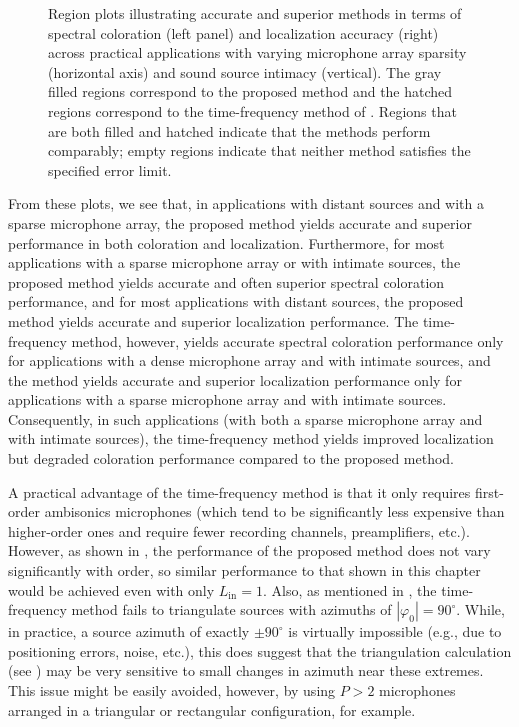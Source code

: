 \begin{figure}[t]
	\caption[Region plots of practical applicability of each interpolation method.]{
	Region plots illustrating accurate and superior methods in terms of spectral coloration (left panel) and localization accuracy (right) across practical applications with varying microphone array sparsity (horizontal axis) and sound source intimacy (vertical).
	The gray filled regions correspond to the proposed method and
	the hatched regions correspond to the time-frequency method of \citet{Thiergart2013}.
	Regions that are both filled and hatched indicate that the methods perform comparably;
	empty regions indicate that neither method satisfies the specified error limit.}
	\label{fig:09_Thiergart_Comparison:Region_Plots}
\end{figure}

From these plots, we see that, in applications with distant sources and with a sparse microphone array, the proposed method yields accurate and superior performance in both coloration and localization.
Furthermore, for most applications with a sparse microphone array or with intimate sources, the proposed method yields accurate and often superior spectral coloration performance, and for most applications with distant sources, the proposed method yields accurate and superior localization performance.
The time-frequency method, however, yields accurate spectral coloration performance only for applications with a dense microphone array and with intimate sources, and the method yields accurate and superior localization performance only for applications with a sparse microphone array and with intimate sources.
Consequently, in such applications (with both a sparse microphone array and with intimate sources), the time-frequency method yields improved localization but degraded coloration performance compared to the proposed method.

A practical advantage of the time-frequency method is that it only requires first-order ambisonics microphones (which tend to be significantly less expensive than higher-order ones and require fewer recording channels, preamplifiers, etc.).
However, as shown in , the performance of the proposed method does not vary significantly with order, so similar performance to that shown in this chapter would be achieved even with only $L_\text{in} = 1$.
Also, as mentioned in , the time-frequency method fails to triangulate sources with azimuths of $|\varphi_0| = 90^\circ$.
While, in practice, a source azimuth of exactly $\pm 90^\circ$ is virtually impossible (e.g., due to positioning errors, noise, etc.), this does suggest that the triangulation calculation (see ) may be very sensitive to small changes in azimuth near these extremes.
This issue might be easily avoided, however, by using $P > 2$ microphones arranged in a triangular or rectangular configuration, for example.

